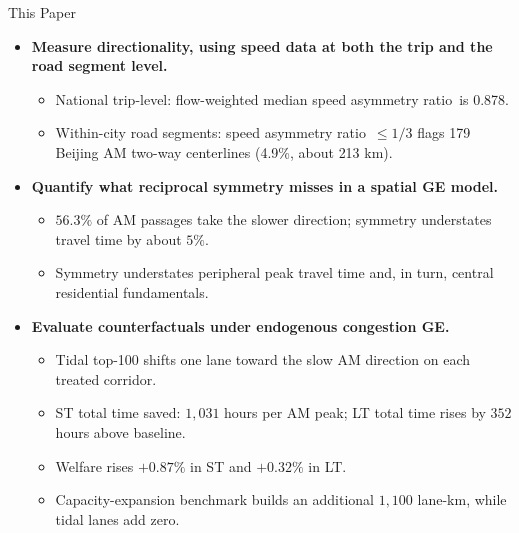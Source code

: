 \documentclass[11pt,aspectratio=169]{beamer}
\newcommand{\good}[1]{\textcolor{blue!70!black}{#1}}
\newcommand{\bad}[1]{\textcolor{red!70!black}{#1}}
\newcommand{\SAR}{speed asymmetry ratio}
\begin{document}
\begin{frame}{This Paper}
\small
\begin{itemize}
  \item \textbf{Measure directionality, using speed data at both the trip and the road segment level.}
  \begin{itemize}\footnotesize
    \item National trip-level: flow-weighted median \SAR\ is \good{0.878}.
    \item Within-city road segments: \SAR\ $\leq1/3$ flags \good{179} Beijing AM two-way centerlines (\good{4.9\%}, about \good{213 km}).
  \end{itemize}
  \item \textbf{Quantify what reciprocal symmetry misses in a spatial GE model.}
  \begin{itemize}\footnotesize
    \item \good{$56.3\%$} of AM passages take the slower direction; symmetry understates travel time by \good{about $5\%$}.
    \item Symmetry understates peripheral peak travel time and, in turn, central residential fundamentals.
  \end{itemize}
  \item \textbf{Evaluate counterfactuals under endogenous congestion GE.}
  \begin{itemize}\footnotesize
    \item Tidal top-100 shifts one lane toward the slow AM direction on each treated corridor.
    \item ST total time saved: \good{$1{,}031$ hours per AM peak}; LT total time rises by \bad{$352$ hours} above baseline.
    \item Welfare rises \good{$+0.87\%$} in ST and \good{$+0.32\%$} in LT.
    \item Capacity-expansion benchmark builds an additional \good{$1{,}100$ lane-km}, while tidal lanes add \good{zero}.
  \end{itemize}
\end{itemize}
\end{frame}
\end{document}

